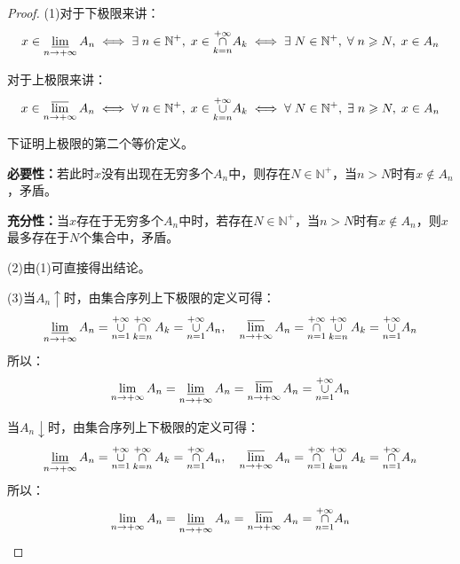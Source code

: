 \begin{proof}
	(1)对于下极限来讲：
	\begin{equation*}
		x\in\varliminf_{n\to+\infty}A_n
		\iff
		\exists\;n\in\mathbb{N}^+,\;x\in\underset{k=n}{\overset{+\infty}{\cap}}A_k
		\iff
		\exists\;N\in\mathbb{N}^+,\;\forall\;n\geqslant N,\;x\in A_n
	\end{equation*}\par
	对于上极限来讲：
	\begin{equation*}
		x\in\varlimsup_{n\to+\infty}A_n
		\iff
		\forall\;n\in\mathbb{N}^+,\;x\in\underset{k=n}{\overset{+\infty}{\cup}}A_k
		\iff
		\forall\;N\in\mathbb{N}^+,\;\exists\;n\geqslant N,\;x\in A_n
	\end{equation*}\par
	下证明上极限的第二个等价定义。\par
	\textbf{必要性：}若此时$x$没有出现在无穷多个$A_n$中，则存在$N\in\mathbb{N}^+$，当$n>N$时有$x\notin A_n$，矛盾。\par
	\textbf{充分性：}当$x$存在于无穷多个$A_n$中时，若存在$N\in\mathbb{N}^+$，当$n>N$时有$x\notin A_n$，则$x$最多存在于$N$个集合中，矛盾。\par
	(2)由(1)可直接得出结论。\par
	(3)当$A_n\uparrow$时，由集合序列上下极限的定义可得：
	\begin{equation*}
		\varliminf_{n\to+\infty}A_n=\underset{n=1}{\overset{+\infty}{\cup}}\underset{k=n}{\overset{+\infty}{\cap}}A_k=\underset{n=1}{\overset{+\infty}{\cup}}A_n,\quad\varlimsup_{n\to+\infty}A_n=\underset{n=1}{\overset{+\infty}{\cap}}\underset{k=n}{\overset{+\infty}{\cup}}A_k=\underset{n=1}{\overset{+\infty}{\cup}}A_n
	\end{equation*}
	所以：
	\begin{equation*}
		\lim_{n\to+\infty}A_n=\varliminf_{n\to+\infty}A_n=\varlimsup_{n\to+\infty}A_n=\underset{n=1}{\overset{+\infty}{\cup}}A_n
	\end{equation*}\par
	当$A_n\downarrow$时，由集合序列上下极限的定义可得：
	\begin{equation*}
		\varliminf_{n\to+\infty}A_n=\underset{n=1}{\overset{+\infty}{\cup}}\underset{k=n}{\overset{+\infty}{\cap}}A_k=\underset{n=1}{\overset{+\infty}{\cap}}A_n,\quad\varlimsup_{n\to+\infty}A_n=\underset{n=1}{\overset{+\infty}{\cap}}\underset{k=n}{\overset{+\infty}{\cup}}A_k=\underset{n=1}{\overset{+\infty}{\cap}}A_n
	\end{equation*}
	所以：
	\begin{equation*}
		\lim_{n\to+\infty}A_n=\varliminf_{n\to+\infty}A_n=\varlimsup_{n\to+\infty}A_n=\underset{n=1}{\overset{+\infty}{\cap}}A_n\qedhere
	\end{equation*}
\end{proof}

